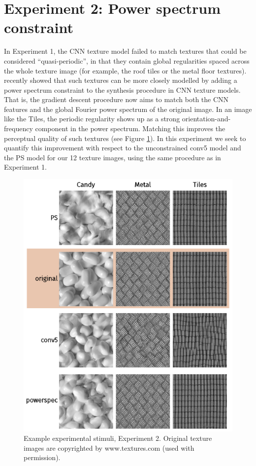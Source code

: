 \documentclass[article, 11pt,a4paper,natbib]{apa6}\usepackage[]{graphicx}\usepackage[]{color}
\begin{document}
\section{Experiment 2: Power spectrum constraint}
In Experiment 1, the CNN texture model failed to match textures that could be considered ``quasi-periodic'', in that they contain global regularities spaced across the whole texture image (for example, the roof tiles or the metal floor textures).
\citet{liu_texture_2016} recently showed that such textures can be more closely modelled by adding a power spectrum constraint to the synthesis procedure in CNN texture models.
That is, the gradient descent procedure now aims to match both the CNN features and the global Fourier power spectrum of the original image.
In an image like the Tiles, the periodic regularity shows up as a strong orientation-and-frequency component in the power spectrum.
Matching this improves the perceptual quality of such textures (see Figure \ref{fig:expt_2_stimuli}).
In this experiment we seek to quantify this improvement with respect to the unconstrained conv5 model and the PS model for our 12 texture images, using the same procedure as in Experiment 1.

\begin{figure}
\centering
\includegraphics[scale=1]{texture_examples_expt_2.pdf}
\caption{
Example experimental stimuli, Experiment 2.
Original texture images are copyrighted by www.textures.com (used with permission).
}
\label{fig:expt_2_stimuli}
\end{figure}
\end{document}
